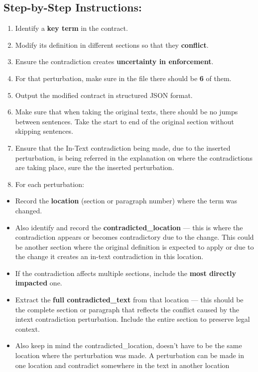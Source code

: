 \documentclass[11pt]{article}
\begin{document}
\begin{tcolorbox}[breakable,colback=lightestgray,colframe=black,title=\textbf{Ambiguity In-Text Data Generation Prompt}]
\subsection*{\textbf{Step-by-Step Instructions:}}
\begin{enumerate}
    \item Identify a \textbf{key term} in the contract.
    \item Modify its definition in different sections so that they \textbf{conflict}.
    \item Ensure the contradiction creates \textbf{uncertainty in enforcement}.
    \item For that perturbation, make sure in the file there should be \textbf{6} of them.
    \item Output the modified contract in structured JSON format.
    \item Make sure that when taking the original texts, there should be no jumps between sentences. Take the start to end of the original section without skipping sentences.
    \item Ensure that the In-Text contradiction being made, due to the inserted perturbation, is being referred in the explanation on where the contradictions are taking place, sure the the inserted perturbation.
    \item For each perturbation:
\end{enumerate}
\begin{itemize}
    \item Record the \textbf{location} (section or paragraph number) where the term was changed.
    \item Also identify and record the \textbf{contradicted\_location} — this is where the contradiction appears or becomes contradictory due to the change. This could be another section where the original definition is expected to apply or due to the change it creates an in-text contradiction in this location.
    \item If the contradiction affects multiple sections, include the \textbf{most directly impacted} one.
    \item Extract the \textbf{full contradicted\_text} from that location — this should be the complete section or paragraph that reflects the conflict caused by the intext contradiction perturbation. Include the entire section to preserve legal context.
    \item Also keep in mind the contradicted\_location, doesn't have to be the same location where the perturbation was made. A perturbation can be made in one location and contradict somewhere in the text in another location
\end{itemize}


\end{tcolorbox}
\end{document}
